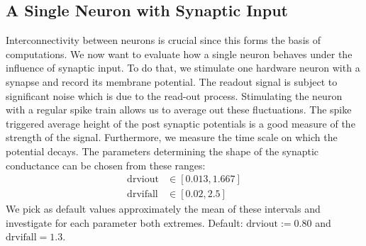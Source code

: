 \documentclass[a4paper,twocolumn]{article}
\begin{document}
\subsection{A Single Neuron with Synaptic Input}
Interconnectivity between neurons is crucial since this forms the basis of
computations.  We now want to evaluate how a single neuron behaves under the influence
 of synaptic input.  To do that,  we stimulate one hardware neuron with a synapse
 and record its membrane potential.  The readout signal is subject to significant
 noise which is due to the read-out process.  Stimulating the neuron with a regular
 spike train allows us to average out these fluctuations.  The spike triggered average
 height of the post synaptic potentials is a good measure of the strength of the signal.
 Furthermore,  we measure the time scale on which the potential decays.
The parameters determining the shape of the synaptic conductance can be chosen
from these ranges:
\begin{align*}
	\text{drviout} &\in \left[ 0.013, 1.667  \right] \\
	\text{drvifall} &\in \left[ 0.02,  2.5  \right]
\end{align*}
We pick as default values approximately the mean of these intervals and
investigate for each parameter both extremes.  Default: $\text{drviout} := 0.80$
and $\text{drvifall}=1.3$.
\end{document}
